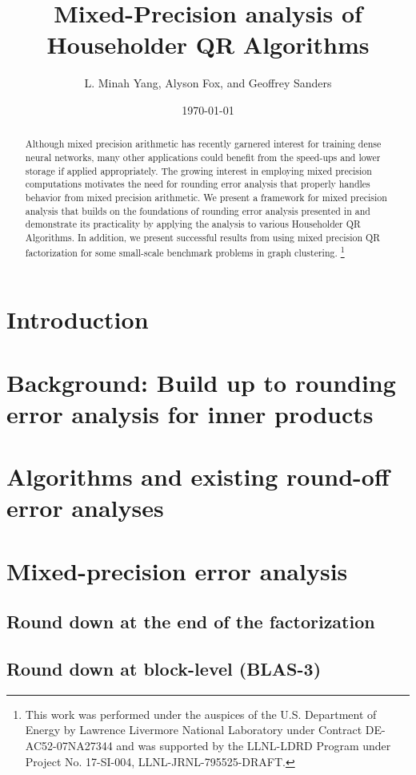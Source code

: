 \documentclass[review,onefignum,onetabnum]{siamart190516}
\title{Mixed-Precision analysis of Householder QR Algorithms}
\author{L. Minah Yang, Alyson Fox, and Geoffrey Sanders}
\date{\today}
\newcommand\blfootnote[1]{%
	\begingroup
	\renewcommand\thefootnote{}\footnote{#1}%
	\addtocounter{footnote}{-1}%
	\endgroup
}
\begin{document}
\maketitle
\begin{abstract}
	Although mixed precision arithmetic has recently garnered interest for training dense neural networks, many other applications could benefit from the  speed-ups and lower storage if applied appropriately. 
	The growing interest in employing mixed precision computations motivates the need for rounding error analysis that properly handles behavior from mixed precision arithmetic.
	We present a framework for mixed precision analysis that builds on the foundations of rounding error analysis presented in \cite{Higham2002} and demonstrate its practicality by applying the analysis to various Householder QR Algorithms. 
	In addition, we present successful results from using mixed precision QR factorization for some small-scale benchmark problems in graph clustering. 
	\blfootnote{This work was performed under the auspices of the U.S. Department of Energy by Lawrence Livermore National Laboratory under Contract DE-AC52-07NA27344 and was supported by the LLNL-LDRD Program under Project No. 17-SI-004, LLNL-JRNL-795525-DRAFT.}
\end{abstract}
\section{Introduction}\label{sec:intro}

\section{Background: Build up to rounding error analysis for inner products}\label{sec:background}

\section{Algorithms and existing round-off error analyses}\label{sec:algo}

\section{Mixed-precision error analysis}\label{sec:mpanalysis}

\subsection{Round down at the end of the factorization}
\subsection{Round down at block-level (BLAS-3)}
\end{document}
